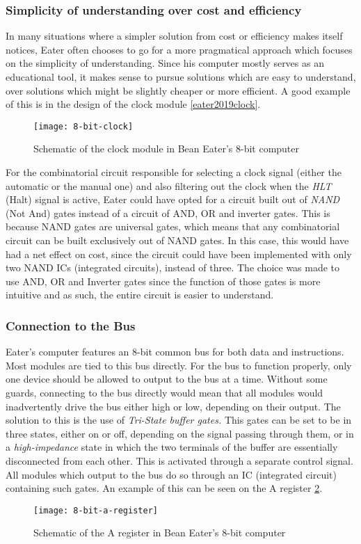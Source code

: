 \subsubsection{Simplicity of understanding over cost and efficiency}

In many situations where a simpler solution from cost or efficiency makes itself notices, Eater often chooses to go for a more pragmatical approach which focuses on the simplicity of understanding. Since his computer mostly serves as an educational tool, it makes sense to pursue solutions which are easy to understand, over solutions which might be slightly cheaper or more efficient. A good example of this is in the design of the clock module \ref{eater2019clock}.

\begin{figure}[ht]
  \centering
  \texttt{[image: 8-bit-clock]}
  \caption{Schematic of the clock module in Bean Eater's 8-bit computer \cite{eater2019highlevel}}
  \label{8-bit-clock}
\end{figure}

For the combinatorial circuit responsible for selecting a clock signal (either the automatic or the manual one) and also filtering out the clock when the \emph{HLT} (Halt) signal is active, Eater could have opted for a circuit built out of \emph{NAND} (Not And) gates instead of a circuit of AND, OR and inverter gates. This is because NAND gates are universal gates, which means that any combinatorial circuit can be built exclusively out of NAND gates. In this case, this would have had a net effect on cost, since the circuit could have been implemented with only two NAND ICs (integrated circuits), instead of three. The choice was made to use AND, OR and Inverter gates since the function of those gates is more intuitive and as such, the entire circuit is easier to understand.

\subsubsection{Connection to the Bus}

Eater's computer features an 8-bit common bus for both data and instructions. Most modules are tied to this bus directly. For the bus to function properly, only one device should be allowed to output to the bus at a time. Without some guards, connecting to the bus directly would mean that all modules would inadvertently drive the bus either high or low, depending on their output. The solution to this is the use of \emph{Tri-State buffer gates.} This gates can be set to be in three states, either on or off, depending on the signal passing through them, or in a \emph{high-impedance} state in which the two terminals of the buffer are essentially disconnected from each other. This is activated through a separate control signal. All modules which output to the bus do so through an IC (integrated circuit) containing such gates. An example of this can be seen on the A register \ref{8-bit-a-register}.

\begin{figure}[ht]
  \centering
  \texttt{[image: 8-bit-a-register]}
  \caption{Schematic of the A register in Bean Eater's 8-bit computer \cite{eater2019highlevel}}
  \label{8-bit-a-register}
\end{figure}
